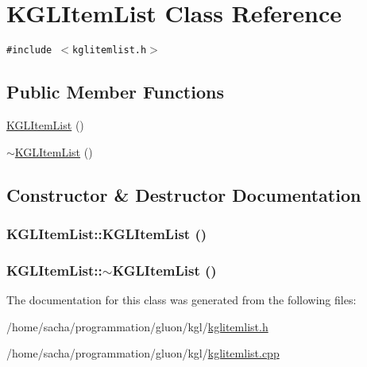 \hypertarget{class_k_g_l_item_list}{
\section{KGLItemList Class Reference}
\label{class_k_g_l_item_list}
}
{\tt \#include $<$kglitemlist.h$>$}

\subsection*{Public Member Functions}
\begin{CompactItemize}
\item 
\hyperlink{class_k_g_l_item_list_35d6828d5eb488bb0406cf59062ef2d0}{KGLItemList} ()
\item 
\hyperlink{class_k_g_l_item_list_30ab7b44c5350a240ec5bb4375ad44b1}{$\sim$KGLItemList} ()
\end{CompactItemize}


\subsection{Constructor \& Destructor Documentation}
\hypertarget{class_k_g_l_item_list_35d6828d5eb488bb0406cf59062ef2d0}{
\subsubsection[{KGLItemList}]{\setlength{\rightskip}{0pt plus 5cm}KGLItemList::KGLItemList ()}}
\label{class_k_g_l_item_list_35d6828d5eb488bb0406cf59062ef2d0}


\hypertarget{class_k_g_l_item_list_30ab7b44c5350a240ec5bb4375ad44b1}{
\subsubsection[{$\sim$KGLItemList}]{\setlength{\rightskip}{0pt plus 5cm}KGLItemList::$\sim$KGLItemList ()}}
\label{class_k_g_l_item_list_30ab7b44c5350a240ec5bb4375ad44b1}




The documentation for this class was generated from the following files:\begin{CompactItemize}
\item 
/home/sacha/programmation/gluon/kgl/\hyperlink{kglitemlist_8h}{kglitemlist.h}\item 
/home/sacha/programmation/gluon/kgl/\hyperlink{kglitemlist_8cpp}{kglitemlist.cpp}\end{CompactItemize}
